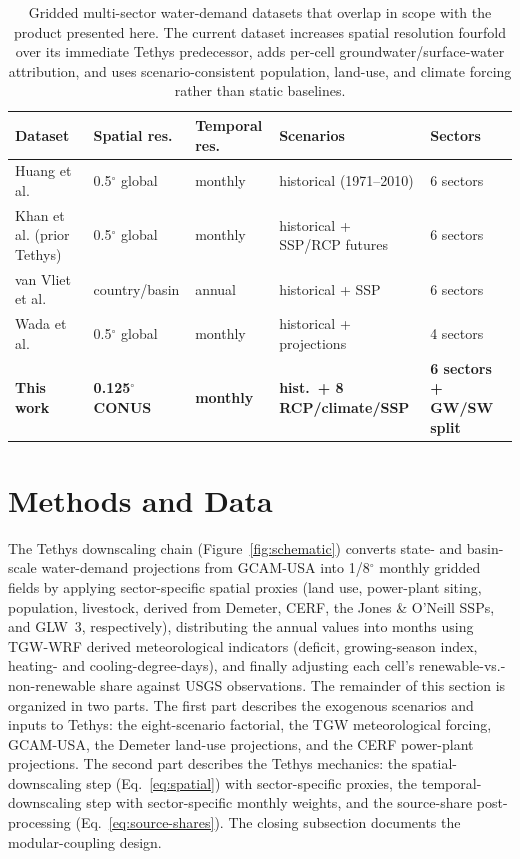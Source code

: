 \documentclass[fleqn,10pt]{wlscirep}
\begin{document}
\begin{table}[ht]
\centering
\small
\begin{tabular}{lllll}
\toprule
\textbf{Dataset} & \textbf{Spatial res.} & \textbf{Temporal res.} & \textbf{Scenarios} & \textbf{Sectors} \\
\midrule
Huang et al.\cite{Huang2018}                   & 0.5$^{\circ}$ global & monthly & historical (1971--2010) & 6 sectors \\
Khan et al.\cite{Khan2023} (prior Tethys)      & 0.5$^{\circ}$ global & monthly & historical + SSP/RCP futures & 6 sectors \\
van Vliet et al.\cite{van_Vliet_2021}          & country/basin & annual & historical + SSP & 6 sectors \\
Wada et al.\cite{Wada_2017}                    & 0.5$^{\circ}$ global & monthly & historical + projections & 4 sectors \\
\textbf{This work}                             & \textbf{0.125$^{\circ}$ CONUS} & \textbf{monthly} & \textbf{hist.\ + 8 RCP/climate/SSP} & \textbf{6 sectors + GW/SW split} \\
\bottomrule
\end{tabular}
\caption{Gridded multi-sector water-demand datasets that overlap in scope with the product presented here. The current dataset increases spatial resolution fourfold over its immediate Tethys predecessor\cite{Khan2023}, adds per-cell groundwater/surface-water attribution, and uses scenario-consistent population, land-use, and climate forcing rather than static baselines.}
\label{tab:prior-datasets}
\end{table}

\section*{Methods and Data}

The Tethys downscaling chain (Figure~\ref{fig:schematic}) converts state- and basin-scale water-demand projections from GCAM-USA into 1/8$^{\circ}$ monthly gridded fields by applying sector-specific spatial proxies (land use, power-plant siting, population, livestock, derived from Demeter, CERF, the Jones \& O'Neill SSPs, and GLW~3, respectively), distributing the annual values into months using TGW-WRF derived meteorological indicators (deficit, growing-season index, heating- and cooling-degree-days), and finally adjusting each cell's renewable-vs.-non-renewable share against USGS observations. The remainder of this section is organized in two parts. The first part describes the exogenous scenarios and inputs to Tethys: the eight-scenario factorial, the TGW meteorological forcing, GCAM-USA, the Demeter land-use projections, and the CERF power-plant projections. The second part describes the Tethys mechanics: the spatial-downscaling step (Eq.~\ref{eq:spatial}) with sector-specific proxies, the temporal-downscaling step with sector-specific monthly weights, and the source-share post-processing (Eq.~\ref{eq:source-shares}). The closing subsection documents the modular-coupling design.
\end{document}
